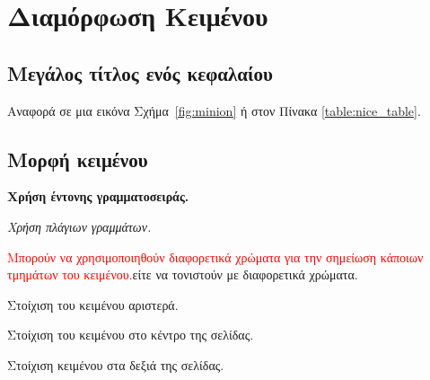 
\chapter{Διαμόρφωση Κειμένου}

\ifpdf
    \graphicspath{{Chapter2/Figs/Raster/}{Chapter2/Figs/PDF/}{Chapter2/Figs/}}
\else
    \graphicspath{{Chapter2/Figs/Vector/}{Chapter2/Figs/}}
\fi


\section[Συμπτηγμένος τίτλος]{Μεγάλος τίτλος ενός κεφαλαίου}

Αναφορά σε μια εικόνα Σχήμα~\ref{fig:minion} ή στον Πίνακα \ref{table:nice_table}.




\section{Μορφή κειμένου}
\textbf{Χρήση έντονης γραμματοσειράς.}

\textit{Χρήση πλάγιων γραμμάτων.}

\textcolor{red}{Μπορούν να χρησιμοποιηθούν διαφορετικά χρώματα για την σημείωση κάποιων τμημάτων του κειμένου.}\colorbox{BurntOrange}{είτε να τονιστούν με διαφορετικά χρώματα.}

\begin{flushleft}
Στοίχιση του κειμένου αριστερά.
\end{flushleft}

\begin{center}
Στοίχιση του κειμένου στο κέντρο της σελίδας.
\end{center}

\begin{flushright}
Στοίχιση κειμένου στα δεξιά της σελίδας.
\end{flushright}


